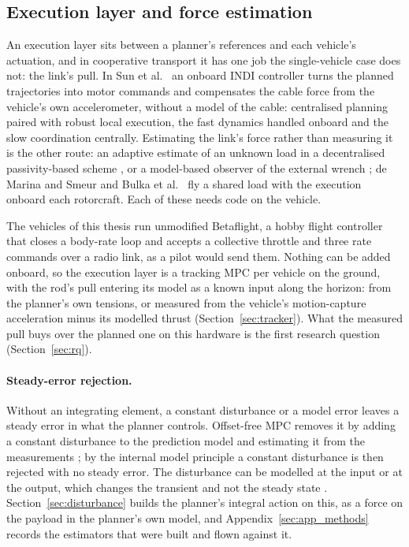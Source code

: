 
\subsection{Execution layer and force estimation}
\label{sec:lit_execution}

An execution layer sits between a planner's references and each vehicle's actuation, and in cooperative transport
it has one job the single-vehicle case does not: the link's pull. In Sun et al.\ \cite{tudelft} an onboard INDI
controller \cite{smeur2016indi} turns the planned trajectories into motor commands and compensates the cable force
from the vehicle's own accelerometer, without a model of the cable: centralised planning paired with robust
local execution, the fast dynamics handled onboard and the slow coordination centrally. Estimating the link's
force rather than measuring it is the other route: an adaptive estimate of an unknown load in a decentralised
passivity-based scheme \cite{klausen2020cooperative}, or a model-based observer of the external wrench
\cite{tagliabue2019robust}; de Marina and Smeur \cite{demarina2019flexible} and Bulka et al.\ \cite{bulka2022experiments} fly a shared load with the execution onboard each rotorcraft. Each of these needs code on the vehicle.

The vehicles of this thesis run unmodified Betaflight, a hobby flight controller that closes a body-rate loop and
accepts a collective throttle and three rate commands over a radio link, as a pilot would send them. Nothing can
be added onboard, so the execution layer is a tracking MPC per vehicle on the ground, with the rod's pull entering
its model as a known input along the horizon: from the planner's own tensions, or measured from the vehicle's
motion-capture acceleration minus its modelled thrust (Section~\ref{sec:tracker}). What the measured pull buys
over the planned one on this hardware is the first research question (Section~\ref{sec:rq}).

\paragraph{Steady-error rejection.} Without an integrating element, a constant disturbance or a model error
leaves a steady error in what the planner controls. Offset-free MPC removes it by adding a constant disturbance
to the prediction model and estimating it from the measurements \cite{muske2002disturbance,
pannocchia2003disturbance, maeder2009linear}; by the internal model principle \cite{francis1976internal} a
constant disturbance is then rejected with no steady error. The disturbance can be modelled at the input or at
the output, which changes the transient and not the steady state \cite{pannocchia2007combined}.
Section~\ref{sec:disturbance} builds the planner's integral action on this, as a force on the payload in the
planner's own model, and Appendix~\ref{sec:app_methods} records the estimators that were built and flown against
it.
